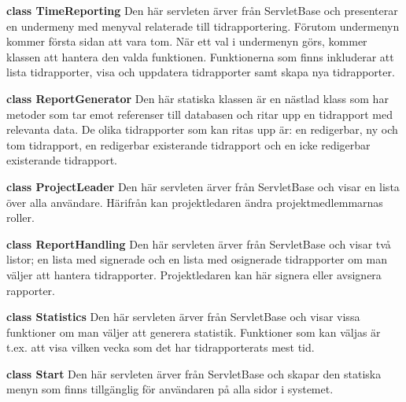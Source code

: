 \documentclass[a4paper]{article}
\begin{document}
\vspace{5mm}
\begin{hangparas}{1.5em}{1}
\textbf{class TimeReporting} Den här servleten ärver från ServletBase och presenterar en undermeny med menyval relaterade till tidrapportering. Förutom undermenyn kommer första sidan att vara tom. När ett val i undermenyn görs, kommer klassen att hantera den valda funktionen. Funktionerna som finns inkluderar att lista tidrapporter, visa och uppdatera tidrapporter samt skapa nya tidrapporter.\end{hangparas}

\vspace{5mm}
\begin{hangparas}{1.5em}{1}
\textbf{class ReportGenerator} Den här statiska klassen är en nästlad klass som har metoder som tar emot referenser till databasen och ritar upp en tidrapport med relevanta data. De olika tidrapporter som kan ritas upp är: en redigerbar, ny och tom tidrapport, en redigerbar existerande tidrapport och en icke redigerbar existerande tidrapport.\end{hangparas}

\vspace{5mm}
\begin{hangparas}{1.5em}{1}
\textbf{class ProjectLeader} Den här servleten ärver från ServletBase och visar en lista över alla användare. Härifrån kan projektledaren ändra projektmedlemmarnas roller. \end{hangparas}

\vspace{5mm}
\begin{hangparas}{1.5em}{1}
\textbf{class ReportHandling} Den här servleten ärver från ServletBase och visar två listor; en lista med signerade och en lista med osignerade tidrapporter om man väljer att hantera tidrapporter. Projektledaren kan här signera eller avsignera rapporter.\end{hangparas}

\vspace{5mm}
\begin{hangparas}{1.5em}{1}
\textbf{class Statistics} Den här servleten ärver från ServletBase och visar vissa funktioner om man väljer att generera statistik. Funktioner som kan väljas är t.ex. att visa vilken vecka som det har tidrapporterats mest tid. \end{hangparas}

\vspace{5mm}
\begin{hangparas}{1.5em}{1}
\textbf{class Start} Den här servleten ärver från ServletBase och skapar den statiska menyn som finns tillgänglig för användaren på alla sidor i systemet. \end{hangparas}
\end{document}
